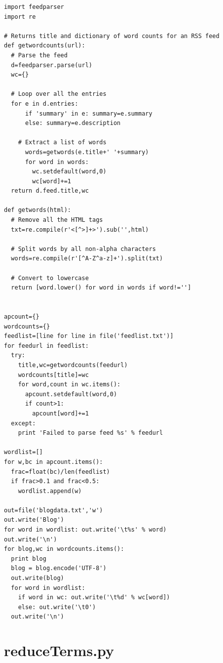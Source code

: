 \documentclass{article}
\begin{document}
\begin{lstlisting}[frame=single, caption=generatefeedvector.py, label=generatefeedvector]
import feedparser
import re

# Returns title and dictionary of word counts for an RSS feed
def getwordcounts(url):
  # Parse the feed
  d=feedparser.parse(url)
  wc={}

  # Loop over all the entries
  for e in d.entries:
      if 'summary' in e: summary=e.summary
      else: summary=e.description

    # Extract a list of words
      words=getwords(e.title+' '+summary)
      for word in words:
        wc.setdefault(word,0)
        wc[word]+=1
  return d.feed.title,wc

def getwords(html):
  # Remove all the HTML tags
  txt=re.compile(r'<[^>]+>').sub('',html)

  # Split words by all non-alpha characters
  words=re.compile(r'[^A-Z^a-z]+').split(txt)

  # Convert to lowercase
  return [word.lower() for word in words if word!='']


apcount={}
wordcounts={}
feedlist=[line for line in file('feedlist.txt')]
for feedurl in feedlist:
  try:
    title,wc=getwordcounts(feedurl)
    wordcounts[title]=wc
    for word,count in wc.items():
      apcount.setdefault(word,0)
      if count>1:
        apcount[word]+=1
  except:
    print 'Failed to parse feed %s' % feedurl

wordlist=[]
for w,bc in apcount.items():
  frac=float(bc)/len(feedlist)
  if frac>0.1 and frac<0.5:
    wordlist.append(w)

out=file('blogdata.txt','w')
out.write('Blog')
for word in wordlist: out.write('\t%s' % word)
out.write('\n')
for blog,wc in wordcounts.items():
  print blog
  blog = blog.encode('UTF-8')
  out.write(blog)
  for word in wordlist:
    if word in wc: out.write('\t%d' % wc[word])
    else: out.write('\t0')
  out.write('\n')
\end{lstlisting}

\section{reduceTerms.py}
\end{document}

